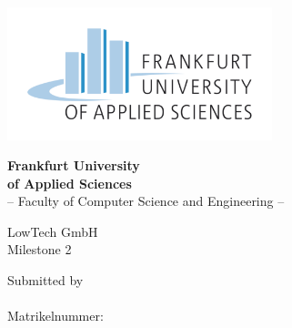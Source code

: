 \thispagestyle{empty}
\begin{titlepage}


  \vspace*{-3,5cm}
  \begin{center}
    \includegraphics[width=7.7cm]{Images/fra-uas_logo} \\ 
  \end{center}

  \begin{center}
    \vspace{0.1cm}
    \LARGE \textbf{Frankfurt University\\ of Applied Sciences}\\
    \vspace{0.4cm}
    \Large -- Faculty of Computer Science and Engineering --
  \end{center}

  \vfill

  \begin{center}
    \huge \textbf{\ThesisTitle}    
  \end{center} 

  \vfill

  \begin{center}
    \Large LowTech GmbH\\
    \vspace{0.3cm}
    \Large Milestone 2   
  \end{center}


  \vfill

  \begin{center}
    \Large Submitted by\\ 
    \vspace{0.3cm}
    \Large \textbf{\myName}\\
    \vspace{0.3cm}
    \normalsize Matrikelnummer: \myStudentId   
  \end{center}


  \vfill




\newpage


  

\end{titlepage}